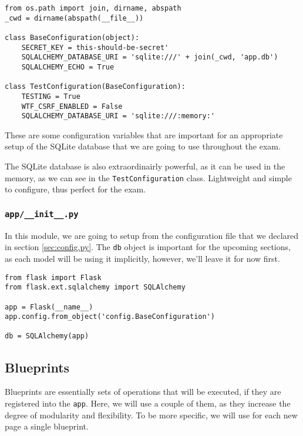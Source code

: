 \documentclass[../main/main.tex]{subfiles}
\begin{document}
\begin{lstlisting}[caption=config.py, label=lst:config.py]
from os.path import join, dirname, abspath
_cwd = dirname(abspath(__file__))

class BaseConfiguration(object):
    SECRET_KEY = this-should-be-secret'
    SQLALCHEMY_DATABASE_URI = 'sqlite:///' + join(_cwd, 'app.db')
    SQLALCHEMY_ECHO = True

class TestConfiguration(BaseConfiguration):
    TESTING = True
    WTF_CSRF_ENABLED = False
    SQLALCHEMY_DATABASE_URI = 'sqlite:///:memory:'
\end{lstlisting}

These are some configuration variables that are important for an
appropriate setup of the SQLite database that we are going to use
throughout the exam. 

The SQLite database is also extraordinairly powerful, as it can be
used in the memory, as we can see in the \lstinline|TestConfiguration|
class. Lightweight and simple to configure, thus perfect for the exam.

\subsubsection{\lstinline|app/__init__.py|}

In this module, we are going to setup from the configuration file that
we declared in section \ref{sec:config.py}. The \lstinline|db| object
is important for the upcoming sections, as each model will be using
it implicitly, however, we'll leave it for now first. 

\begin{lstlisting}[caption=app/\_\_init\_\_.py, label=lst:app/init.py]
from flask import Flask
from flask.ext.sqlalchemy import SQLAlchemy

app = Flask(__name__)
app.config.from_object('config.BaseConfiguration')

db = SQLAlchemy(app)
\end{lstlisting}

\subsection{Blueprints}

Blueprints are essentially sets of operations that will be executed,
if they are registered into the \lstinline|app|. Here, we will use a
couple of them, as they increase the degree of modularity and
flexibility. To be more specific, we will use for each new page a
single blueprint. 
\end{document}
